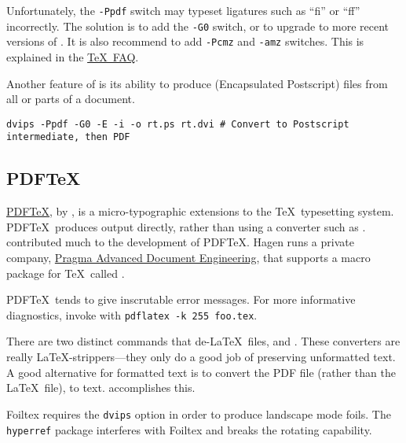 \documentclass[12pt]{article}
\begin{document}
Unfortunately, the \verb'-Ppdf' switch may typeset ligatures such as
``fi'' or ``ff'' incorrectly.
The solution is to add the \verb'-G0' switch, or to upgrade to more
recent versions of .
It is also recommend to add \verb'-Pcmz' and \verb'-amz' switches.
This is explained in the 
\href{http://www.tex.ac.uk/cgi-bin/texfaq2html?label=charshift}{\TeX~FAQ}.  

Another feature of  is its ability to produce
 (Encapsulated Postscript) files from all or parts of a
document.
\begin{verbatim}
dvips -Ppdf -G0 -E -i -o rt.ps rt.dvi # Convert to Postscript intermediate, then PDF
\end{verbatim}

\subsection[PDF\TeX]{PDF\TeX}\label{sxn:pdftex}
\href{http://www.tug.org/applications/pdftex}{PDF\TeX}, by
, is a micro-typographic
extensions to the \TeX\ typesetting system.
PDF\TeX\ produces  output directly, rather than using a
 converter such as .
 contributed much to the development of
PDF\TeX. 
Hagen runs a private company,
\href{http://www.pragma-ade.com}{Pragma Advanced Document Engineering}, 
that supports a macro package for \TeX\ called .

PDF\TeX\ tends to give inscrutable error messages.
For more informative diagnostics, invoke with \verb'pdflatex -k 255 foo.tex'.

There are two distinct commands that de-\LaTeX\ files, 
and . 
These converters are really \LaTeX-strippers---they only do a good
job of preserving unformatted text. 
A good alternative for formatted text is to convert the PDF file
(rather than the \LaTeX\ file), to text.
 accomplishes this.

Foiltex requires the \verb'dvips' option in order to produce landscape
mode foils. 
The \verb'hyperref' package interferes with Foiltex and breaks the 
rotating capability.
\end{document}
